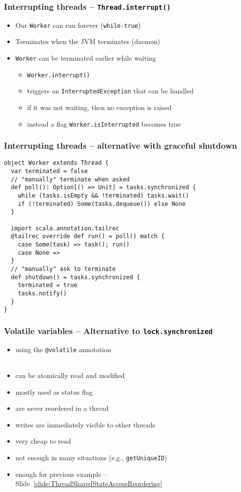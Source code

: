 \documentclass[aspectratio=169]{beamer}
\begin{document}
\begin{frame}\frametitle{Interrupting threads -- \texttt{Thread.interrupt()}}
\begin{itemize}
  \item Our \texttt{Worker} can run forever (\texttt{while-true})
  \item Terminates when the JVM terminates (daemon)
  \item \texttt{Worker} can be terminated earlier while waiting
    \begin{itemize}
      \item \alert{\texttt{Worker.interrupt()}}
      \item triggers an \alert{\texttt{InterruptedException}} that can be handled
      \item if it was not waiting, then no exception is raised
      \item instead a flag \alert{\texttt{Worker.isInterrupted}} becomes true
    \end{itemize}
\end{itemize}
\end{frame}

\begin{frame}[fragile]\frametitle{Interrupting threads -- alternative with graceful shutdown}
    
\begin{lstlisting}[emph={sleep,log,thread,join,synchronized,wait,notify}]
object Worker extends Thread {
  var terminated = false
  // "manually" terminate when asked
  def poll(): Option[() => Unit] = tasks.synchronized {
    while (tasks.isEmpty && !terminated) tasks.wait()
    if (!terminated) Some(tasks.dequeue()) else None
  }

  import scala.annotation.tailrec
  @tailrec override def run() = poll() match {
    case Some(task) => task(); run()
    case None =>
  }
  // "manually" ask to terminate
  def shutdown() = tasks.synchronized {
    terminated = true
    tasks.notify()
  }
}
\end{lstlisting}

\end{frame}


\begin{frame}\frametitle{Volatile variables -- Alternative to \texttt{lock.synchronized}}
\begin{itemize}
  \item using the \texttt{\alert{@volatile}} annotation
  \\~
  \item can be atomically read and modified
  \item mostly used as status flag
  \item are never reordered in a thread
  \item writes are immediately visible to other threads
  \item very cheap to read
  \item not enough in many situations (e.g., \texttt{getUniqueID})
  \item enough for previous example -- Slide~\ref{slide:ThreadSharedStateAccessReordering}
\end{itemize}
\end{frame}
\end{document}
